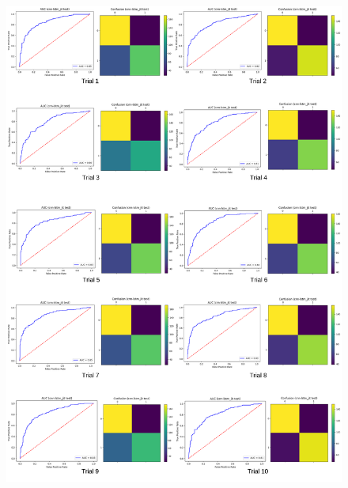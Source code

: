 \documentclass[format=sigconf, nonacm=true, review=true, screen=true]{acmart}
\begin{document}
\begin{figure}
    \centering
    \includegraphics[width=0.9\columnwidth]{figures/cnn-lstm_1.png}
    \label{fig:cnn-lstm_1}
\end{figure}
\end{document}
